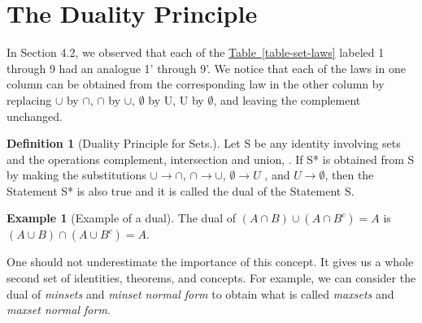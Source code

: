 \documentclass[10pt,]{book}
\theoremstyle{plain}
\theoremstyle{definition}
\newtheorem{definition}[theorem]{Definition}
\theoremstyle{definition}
\newtheorem{example}[theorem]{Example}
\theoremstyle{definition}
\begin{document}
\section[The Duality Principle]{The Duality Principle}\label{s-duality-principle}
In Section 4.2, we observed that each of the \hyperref[table-set-laws]{Table~\ref{table-set-laws}} labeled 1 through 9 had an analogue 1' through 9'. We notice that each of the laws in one column can be obtained from the corresponding law in the other column by replacing \(\cup\) by \(\cap \), \(\cap \) by \(\cup \), \(\emptyset \) by U, U by \(\emptyset\), and leaving the complement unchanged.%
\begin{definition}[Duality Principle for Sets.]\label{def-duality-sets.}
 Let S be any identity involving sets and the operations complement, intersection and union, . If S*
is obtained from S by making the substitutions \(\cup  \to  \cap\), \(\cap \to \cup\), \(\emptyset \to U\) , and \(U\to \emptyset\), then the Statement S* is also true and it is called the dual of the Statement S.
%
\end{definition}
\begin{example}[Example of a dual]\label{ex-dual-example}
 The dual of \((A \cap  B) \cup  \left(A \cap B^c \right) = A\) is \((A\cup B)\cap \left(A\cup B^c\right)=A\).%
\end{example}
\par
One should not underestimate the importance of this concept. It gives us a whole second set of identities, theorems, and concepts. For example, we can consider the dual of \emph{minsets} and \emph{minset normal form} to obtain what is called \emph{maxsets} and \emph{maxset normal form}.%
\typeout{************************************************}
\typeout{************************************************}
\end{document}

